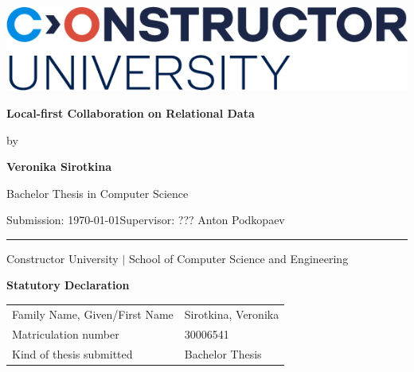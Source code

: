 \documentclass[a4paper, 11pt, oneside]{article}
\newcommand{\mylastname}{Sirotkina}
\newcommand{\myfirstname}{Veronika}
\newcommand{\mynumber}{30006541}
\newcommand{\myname}{\myfirstname{} \mylastname{}}
\newcommand{\mytitle}{Local-first Collaboration on Relational Data}
\newcommand{\mysupervisor}{??? Anton Podkopaev}
\theoremstyle{definition}
\begin{document}

\thispagestyle{empty}

\begin{flushright}
\includegraphics[scale=0.8]{img/bsc-logo.png}
\end{flushright}
\vspace*{40mm}
\begin{center}
\huge \textbf{\mytitle}
\end{center}
\vspace*{4mm}
\begin{center}
\Large by
\end{center}
\vspace*{4mm}
\begin{center}
\LARGE \textbf{\myname}
\end{center}
\vspace*{20mm}
\begin{center}
\Large Bachelor Thesis in Computer Science
\end{center}
\vfill
\begin{flushleft}
\large Submission: \today \hfill Supervisor: \mysupervisor \\ \rule{\textwidth}{1pt}
\end{flushleft}
\begin{center}
Constructor University $|$ School of Computer Science and Engineering
\end{center}

\newpage
\thispagestyle{empty}

\begin{center}
\Large \textbf{Statutory Declaration}
\vspace*{8mm}
\end{center}

\begin{center}
\begin{tabular}{|l|p{85mm}|}
\hline
Family Name, Given/First Name & \mylastname, \myfirstname \\
Matriculation number          & \mynumber                 \\
Kind of thesis submitted      & Bachelor Thesis           \\
\hline
\end{tabular}
\vspace*{8mm}
\end{center}
\end{document}
